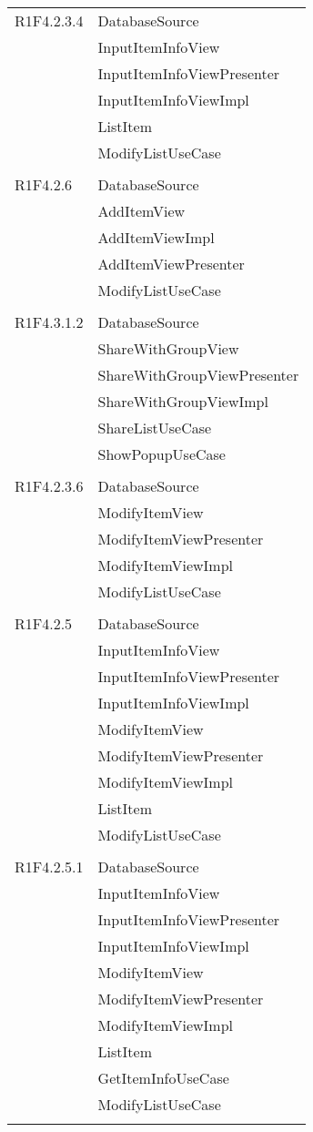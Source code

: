 \begin{center}
\begin{longtable}{|p{7cm}|p{5cm}|}
		R1F4.2.3.4 & DatabaseSource \\ & InputItemInfoView \\ & InputItemInfoViewPresenter \\ & InputItemInfoViewImpl \\ & ListItem \\ & ModifyListUseCase \\ & \\ \hline
		R1F4.2.6 & DatabaseSource \\ & AddItemView \\ & AddItemViewImpl \\ & AddItemViewPresenter \\ & ModifyListUseCase \\ & \\ \hline
		R1F4.3.1.2 & DatabaseSource \\ & ShareWithGroupView \\ & ShareWithGroupViewPresenter \\ & ShareWithGroupViewImpl \\ & ShareListUseCase \\ & ShowPopupUseCase \\ & \\ \hline
		R1F4.2.3.6 & DatabaseSource \\ & ModifyItemView \\ & ModifyItemViewPresenter \\ & ModifyItemViewImpl \\ & ModifyListUseCase \\ & \\ \hline
		R1F4.2.5 & DatabaseSource \\ & InputItemInfoView \\ & InputItemInfoViewPresenter \\ & InputItemInfoViewImpl \\ & ModifyItemView \\ & ModifyItemViewPresenter \\ & ModifyItemViewImpl \\ & ListItem \\ & ModifyListUseCase \\ & \\ \hline
		R1F4.2.5.1 & DatabaseSource \\ & InputItemInfoView \\ & InputItemInfoViewPresenter \\ & InputItemInfoViewImpl \\ & ModifyItemView \\ & ModifyItemViewPresenter \\ & ModifyItemViewImpl \\ & ListItem \\ & GetItemInfoUseCase \\ & ModifyListUseCase \\ & \\ \hline

\end{longtable}
\end{center}
